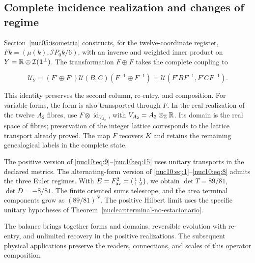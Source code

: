 \subsection{Complete incidence realization and changes of regime}

Section~\ref{nuc05:isometria} constructs, for the twelve-coordinate register, \(Fk=(\mu(k),\mathcal IP_0k/6)\), with an inverse and weighted inner product on \(Y=\mathbb R\oplus\mathcal I(\mathbf1^\perp)\). The transformation \(F\oplus F\) takes the complete coupling to

\begin{equation}
\mathcal U_Y=(F'\oplus F')\mathcal U(B,C)(F^{-1}\oplus F^{-1})
=\mathcal U(F'BF^{-1},F'CF^{-1}).
\label{nuc10:eq:16}
\end{equation}

This identity preserves the second column, re-entry, and composition. For variable forms, the form is also transported through \(F\). In the real realization of the twelve \(A_2\) fibres, use \(F\otimes\operatorname{id}_{V_{A_2}}\), with \(V_{A_2}=A_2\otimes_{\mathbb Z}\mathbb R\). Its domain is the real space of fibres; preservation of the integer lattice corresponds to the lattice transport already proved. The map \(F\) recovers \(K\) and retains the remaining genealogical labels in the complete state.

The positive version of \eqref{nuc10:eq:9}–\eqref{nuc10:eq:15} uses unitary transports in the declared metrics. The alternating-form version of \eqref{nuc10:eq:1}–\eqref{nuc10:eq:8} admits the three Euler regimes. With \(E=F_{\rm av}^2=\left(\begin{smallmatrix}1&1\\1&2\end{smallmatrix}\right)\), we obtain \(\det T=89/81\), \(\det D=-8/81\). The finite oriented sums telescope, and the area terminal components grow as \((89/81)^N\). The positive Hilbert limit uses the specific unitary hypotheses of Theorem~\ref{nuclear:terminal-no-estacionario}.

The balance brings together forms and domains, reversible evolution with re-entry, and unlimited recovery in the positive realizations. The subsequent physical applications preserve the readers, connections, and scales of this operator composition.
